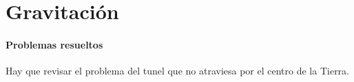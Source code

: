 \documentclass[/home/hernan/Documentos/Apuntes_mecanica_teorica/main.tex]{subfiles}
\begin{document}
    \part{Gravitación}

    \subsection{Problemas resueltos}
    Hay que revisar el problema del tunel que no atraviesa por el centro de la Tierra.
    
\end{document}
